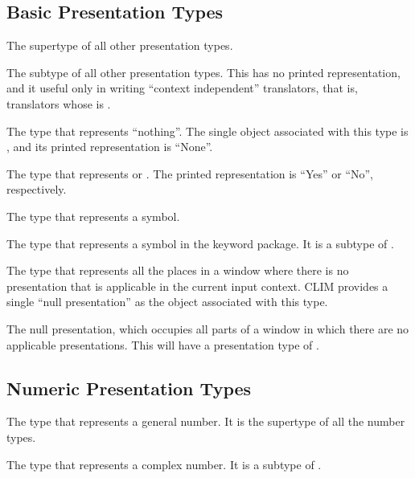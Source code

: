 \subsection {Basic Presentation Types}

 {}

The supertype of all other presentation types.

 {}

The subtype of all other presentation types.  This has no printed
representation, and it useful only in writing ``context independent''
translators, that is, translators whose  is .

 {}

The type that represents ``nothing''.  The single object associated with this
type is , and its printed representation is ``None''.

 {}

The type that represents  or .  The printed
representation is ``Yes'' or ``No'', respectively.

 {}

The type that represents a symbol.

 {}

The type that represents a symbol in the keyword package.  It is a subtype of
.

 {}

The type that represents all the places in a window where there is no
presentation that is applicable in the current input context.  CLIM provides a
single ``null presentation'' as the object associated with this type.


The null presentation, which occupies all parts of a window in which there are
no applicable presentations.  This will have a presentation type of .


\subsection {Numeric Presentation Types}

 {}

The type that represents a general number.  It is the supertype of all the
number types.

 {}

The type that represents a complex number.  It is a subtype of .

